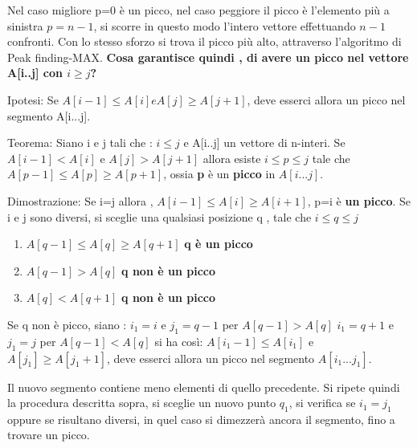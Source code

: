 \documentclass[twocolumn]{article}
\newcommand{\definition}[1]{\begin{mycolorbox}[colback=colorone]
\fontfamily{qcr}\selectfont #1 \fontfamily{cmr}\selectfont
\end{mycolorbox}}
\newcommand{\hypothesis}[1]{\begin{mycolorbox}[colback=colortwo]
\fontfamily{qcr}\selectfont #1 \fontfamily{cmr}\selectfont
\end{mycolorbox}}
\newcommand{\demonstration}[1]{\begin{mycolorbox}[colback=colothree]
\fontfamily{qcr}\selectfont #1 \fontfamily{cmr}\selectfont
\end{mycolorbox}}
\begin{document}
Nel caso migliore p=0 è un picco, nel caso peggiore il picco è l'elemento più a sinistra $p=n-1$, si scorre in questo modo l'intero vettore effettuando $n-1$ confronti.
\newline Con lo stesso sforzo si trova il picco più alto, attraverso l'algoritmo di Peak finding-MAX.
\newline \textbf{Cosa garantisce quindi , di avere un picco nel vettore A[i..j] con $i \geq j$?}
\newline 
\hypothesis{
Ipotesi: \newline Se $A[i-1] \leq A[i] e A[j] \geq A[j+1]$, deve esserci allora un picco nel segmento A[i...j].}
\definition{
\newline Teorema: \newline Siano i e j tali che :
\newline $i \leq j$ e A[i..j] un vettore di n-interi.
\newline Se $A[i-1] < A[i]$ e $A[j] > A[j+1]$ allora esiste $i \leq p \leq j$ tale che $A[p-1] \leq A[p] \geq A[p+1]$, ossia \textbf{p} è un \textbf{picco} in $A[i...j]$.}
\demonstration{
\newline Dimostrazione: \newline Se i=j allora , $A[i-1] \leq A[i] \geq A[i+1]$,
p=i è \textbf{un picco}.
\newline Se i e j sono diversi, si sceglie una qualsiasi posizione q , tale che $i \leq q \leq j$
\begin{enumerate}
    \item $A[q-1] \leq A[q] \geq A[q+1]$ \textbf{q è un picco}
    \item $A[q-1] > A[q]$ \textbf{q non è un picco}
    \item $A[q] < A[q+1]$ \textbf{q non è un picco}
\end{enumerate}

\newline Se q non è picco, siano :
\newline $ i_1 = i $ e $ j_1 = q-1$ per $A[q-1] > A[q]$
\newline $ i_1 = q+1 $ e $ j_1 = j$ per $A[q-1] < A[q]$
\newline si ha così:
\newline $A[i_1-1] \leq A[i_1]$ e $A[j_1] \geq A[j_1+1]$, deve esserci allora un picco nel segmento $A[i_1...j_1]$.}

\newline Il nuovo segmento contiene meno elementi di quello precedente.
Si ripete quindi la procedura descritta sopra, si sceglie un nuovo punto $ q_1 $, si verifica se $ i_1 = j_1$ oppure se risultano diversi, in quel caso si dimezzerà ancora il segmento, fino a trovare un picco.
\end{document}
